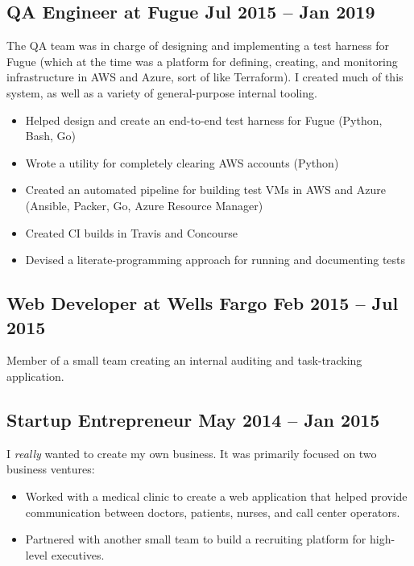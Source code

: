 \documentclass[12pt]{article}
\begin{document}
     
 

\subsection*{QA Engineer at Fugue \hfill Jul 2015 -- Jan 2019}

The QA team was in charge of designing and implementing a test harness for Fugue
(which at the time was a platform for defining, creating, and monitoring
infrastructure in AWS and Azure, sort of like Terraform). I created much of this
system, as well as a variety of general-purpose internal tooling.

\begin{itemize}
\item Helped design and create an end-to-end test harness for Fugue (Python,
  Bash, Go)
\item Wrote a utility for completely clearing AWS accounts (Python)
\item Created an automated pipeline for building test VMs in AWS and Azure
  (Ansible, Packer, Go, Azure Resource Manager)
\item Created CI builds in Travis and Concourse
\item Devised a literate-programming approach for running and documenting tests
\end{itemize}

     
   

\subsection*{Web Developer at Wells Fargo \hfill Feb 2015 -- Jul 2015}

Member of a small team creating an internal auditing and task-tracking
application.

    

\subsection*{Startup Entrepreneur \hfill May 2014 -- Jan 2015}

I \textit{really} wanted to create my own business. It was primarily focused on
two business ventures:

\begin{itemize}
\item Worked with a medical clinic to create a web application that helped
  provide communication between doctors, patients, nurses, and call center
  operators.

\item Partnered with another small team to build a recruiting platform for
  high-level executives.
\end{itemize}
\end{document}
